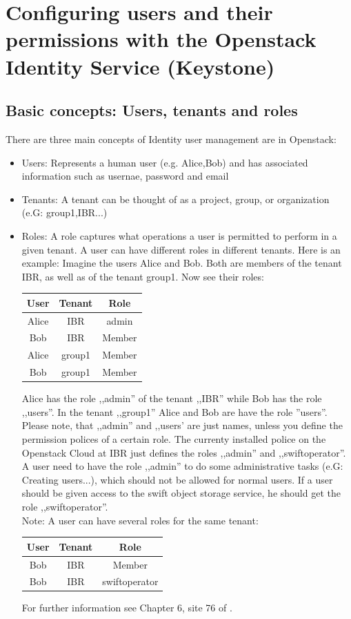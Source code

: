 \documentclass[a4paper,bibtotoc,english,liststotoc]{scrartcl}
\begin{document}
\section{Configuring users and their permissions with the Openstack
  Identity Service (Keystone)}

\subsection{Basic concepts: Users, tenants and roles}
\label{sec:basic-conc-users}
There are three main concepts of Identity user management are in Openstack:
\begin{itemize}
\item Users: Represents a human user (e.g. Alice,Bob) and has associated
  information such as usernae, password and email
\item Tenants: A tenant can be thought of as a project, group, or
  organization (e.G: group1,IBR...) 
\item Roles: A role captures what operations a user is permitted to
  perform in a given tenant.  A user can have different roles in
  different tenants. Here is an example: Imagine the users Alice and
  Bob. Both are members of the tenant IBR, as well as of the tenant
  group1. Now see their roles:\\
  \begin{center}
  \begin{tabular}{c|c|c}
    User & Tenant & Role  \tabularnewline \hline
    Alice &IBR& admin \tabularnewline \hline
    Bob &IBR&Member  \tabularnewline \hline
    Alice&group1&Member \tabularnewline \hline
    Bob&group1&Member
  \end{tabular}  
  \end{center}
  Alice has the role ,,admin'' of the  tenant ,,IBR'' while
  Bob has the role ,,users''. In the tenant ,,group1'' Alice and Bob
  are have the role ''users''. Please note, that ,,admin'' and
  ,,users' are just names, unless you define the permission polices of a
  certain role. The currenty installed police on the Openstack Cloud
  at IBR just defines the roles ,,admin'' and ,,swiftoperator''.
  A user need to have the role ,,admin'' to do some administrative tasks (e.G: Creating
  users...), which should not be allowed for normal users. If a user
  should be given access to the swift object storage service, he
  should get the role ,,swiftoperator''.\\
Note: A user can have several roles for the same tenant:
\begin{center}
  \begin{tabular}{c|c|c}
    User & Tenant & Role  \tabularnewline \hline
    Bob &IBR&Member \tabularnewline \hline
    Bob & IBR&swiftoperator%
  \end{tabular}  
  \end{center}
 For further information see Chapter 6, site 76 of \cite{computeadmin}.%
\end{itemize}
\end{document}
